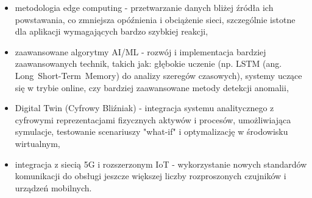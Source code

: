 \begin{itemize}
    \item metodologia edge computing - przetwarzanie danych bliżej źródła ich powstawania, co zmniejsza opóźnienia i obciążenie sieci, szczególnie istotne dla aplikacji wymagających bardzo szybkiej reakcji,
    \item zaawansowane algorytmy AI/ML - rozwój i implementacja bardziej zaawansowanych technik, takich jak: głębokie uczenie (np. LSTM (ang. \mbox{Long Short-Term Memory}) do analizy szeregów czasowych), systemy uczące się w trybie online, czy bardziej zaawansowane metody detekcji anomalii,
    \item Digital Twin (Cyfrowy Bliźniak) - integracja systemu analitycznego z cyfrowymi reprezentacjami fizycznych aktywów i procesów, umożliwiająca symulacje, testowanie scenariuszy "what-if" i optymalizację w środowisku wirtualnym,
    \item integracja z siecią 5G i rozszerzonym IoT - wykorzystanie nowych standardów komunikacji do obsługi jeszcze większej liczby rozproszonych czujników i urządzeń mobilnych.
\end{itemize}